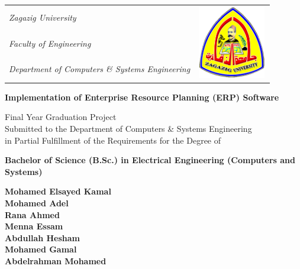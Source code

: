 \documentclass[11pt,a4paper,oneside]{bth}
\begin{document}
\pagestyle{plain}




{\pagestyle{empty}
\changepage{4.5cm}{2.5cm}{-0.5cm}{-1cm}{}{-2cm}{}{}{}
\noindent%
{\large
\begin{tabular}{p{} p{}}
\textit{Zagazig University}&\multirow{3}{*}{\includegraphics[width=3cm, height=3.2cm]{zagazig_uni}}\\
\textit{Faculty of Engineering}\\
\textit{Department of Computers \& Systems Engineering}\\
\end{tabular}}


\begin{center}

\par\vspace {4cm}


{\Huge\textbf{Implementation of Enterprise Resource Planning (ERP) Software}}

\par\vspace {1cm}

{\Large Final Year Graduation Project}\\
{\Large Submitted to the Department of Computers \& Systems Engineering}\\
{\Large in Partial Fulfillment of the Requirements for the Degree of}\\
\par\vspace {.5cm}
{\Large \textbf{Bachelor of Science (B.Sc.) in Electrical Engineering (Computers and Systems)}}


\par\vspace {2cm}

{\Large\textbf{Mohamed Elsayed Kamal}}\\
{\Large\textbf{Mohamed Adel}}\\
{\Large\textbf{Rana Ahmed}}\\
{\Large\textbf{Menna Essam}}\\
{\Large\textbf{Abdullah Hesham}}\\
{\Large\textbf{Mohamed Gamal}}\\
{\Large\textbf{Abdelrahman Mohamed}}\\


\end{center}}
\end{document}
